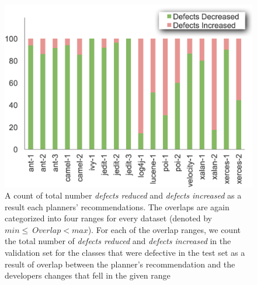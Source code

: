 \begin{figure}[!tbp]
\centering 
\includegraphics[width=0.75\linewidth]{rq2_3.png}
\caption{A count of total number \textit{defects reduced} and \textit{defects increased} as a result each planners' recommendations. The overlaps are again categorized into four ranges for every dataset (denoted by $min\leq~Overlap<max$). For each of the overlap ranges, we count the total number of \textit{defects reduced} and \textit{defects increased} in the validation set for the classes that were defective in the test set as a result of overlap between the planner's recommendation and the developers changes that fell in the given range}
\label{fig:rq2_1}
\end{figure}